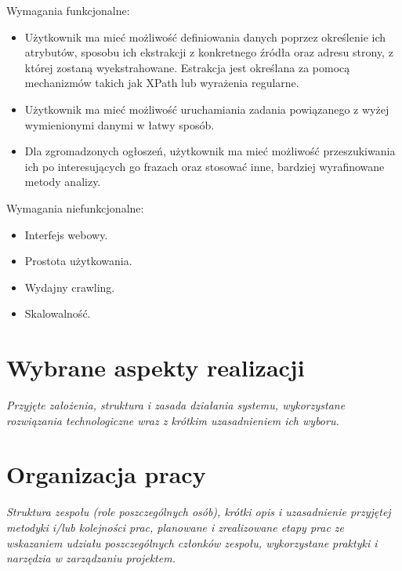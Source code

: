 \documentclass[polish,12pt]{aghthesis}
\begin{document}
Wymagania funkcjonalne:
\begin{itemize}
\item Użytkownik ma mieć możliwość definiowania danych poprzez określenie ich atrybutów,
sposobu ich ekstrakcji z konkretnego źródła oraz adresu strony, z której zostaną
wyekstrahowane. Estrakcja jest określana za pomocą mechanizmów takich jak XPath lub wyrażenia 
regularne.
\item Użytkownik ma mieć możliwość uruchamiania zadania powiązanego z wyżej
wymienionymi danymi w łatwy sposób.
\item Dla zgromadzonych ogłoszeń, użytkownik ma mieć możliwość przeszukiwania ich po
interesujących go frazach oraz stosować inne, bardziej wyrafinowane metody analizy.
\end{itemize}

Wymagania niefunkcjonalne:
\begin{itemize}
\item Interfejs webowy.
\item Prostota użytkowania.
\item Wydajny crawling.
\item Skalowalność.
\end{itemize}

\section{Wybrane aspekty realizacji}
\label{sec:wybrane-aspekty-realizacji}

\emph{Przyjęte założenia, struktura i zasada działania systemu,
  wykorzystane rozwiązania technologiczne wraz z krótkim uzasadnieniem
  ich wyboru.}

\section{Organizacja pracy}
\label{sec:organizacja-pracy}

\emph{Struktura zespołu (role poszczególnych osób), krótki opis i
  uzasadnienie przyjętej metodyki i/lub kolejności prac, planowane i
  zrealizowane etapy prac ze wskazaniem udziału poszczególnych
  członków zespołu, wykorzystane praktyki i narzędzia w zarządzaniu
  projektem.}
\end{document}
